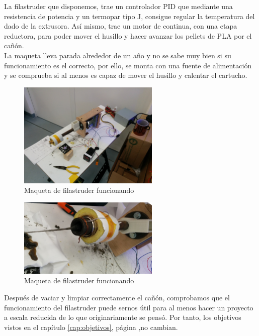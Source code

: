 La filastruder que disponemos, trae un controlador PID que mediante una resistencia de potencia y un termopar tipo J, consigue regular la temperatura del dado de la extrusora. Así mismo, trae un motor de continua, con una etapa reductora, para poder mover el husillo y hacer avanzar los pellets de PLA por el cañón.\\

La maqueta lleva parada alrededor de un año y no se sabe muy bien si su funcionamiento es el correcto, por ello, se monta con una fuente de alimentación y se comprueba si al menos es capaz de mover el husillo y calentar el cartucho.\\

	\begin{figure}[H]
            \centering
            \includegraphics[width=0.6\textwidth]{images/filaextruder/IMG_20150225_093400.jpg}
            \caption{Maqueta de filastruder funcionando}
            \label{fig:hardware_filastruder2}
    \end{figure}
    	\begin{figure}[H]
            \centering
            \includegraphics[width=0.6\textwidth]{images/filaextruder/IMG_20150225_124525.jpg}
            \caption{Maqueta de filastruder funcionando}
            \label{fig:hardware_filastruder3}
    \end{figure}

Después de vaciar y limpiar correctamente el cañón, comprobamos que el funcionamiento del filastruder puede sernos útil para al menos hacer un proyecto a escala reducida de lo que originariamente se pensó. Por tanto, los objetivos vistos en el capítulo \ref{cap:objetivos}, página \pageref{cap:objetivos},no cambian.\\

